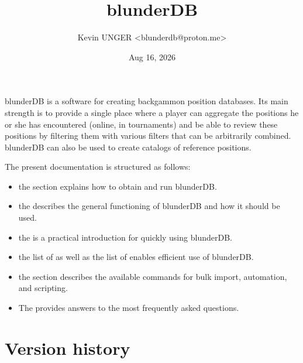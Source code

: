 \documentclass[letterpaper,10pt,english]{sphinxmanual}
\title{blunderDB}
\date{Aug 16, 2026}
\author{Kevin UNGER <blunderdb@proton.me>}
\begin{document}
\pagestyle{empty}
\sphinxmaketitle
\pagestyle{plain}
\sphinxtableofcontents
\pagestyle{normal}
\label{\detokenize{index::doc}}


\sphinxAtStartPar
blunderDB is a software for creating backgammon position databases. Its main strength is to provide a single place where a player can aggregate the positions he or she has encountered (online, in tournaments) and be able to review these positions by filtering them with various filters that can be arbitrarily combined. blunderDB can also be used to create catalogs of reference positions.

\sphinxAtStartPar
The present documentation is structured as follows:
\begin{itemize}
\item {} 
\sphinxAtStartPar
the  section explains how to obtain and run blunderDB.

\item {} 
\sphinxAtStartPar
the  describes the general functioning of blunderDB and how it should be used.

\item {} 
\sphinxAtStartPar
the  is a practical introduction for quickly using blunderDB.

\item {} 
\sphinxAtStartPar
the list of  as well as the list of  enables efficient use of blunderDB.

\item {} 
\sphinxAtStartPar
the  section describes the available commands for bulk import, automation, and scripting.

\item {} 
\sphinxAtStartPar
The  provides answers to the most frequently asked questions.

\end{itemize}


\chapter{Version history}
\label{\detokenize{index:historique-des-versions}}
\end{document}
